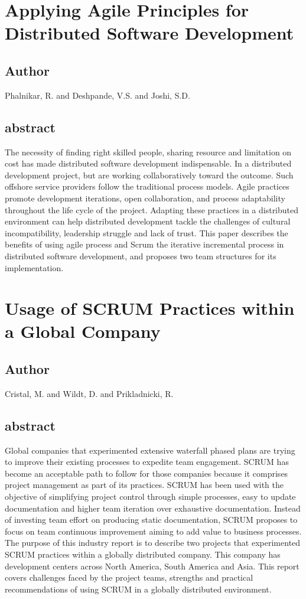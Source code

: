 \documentclass[lnbip,sechang,a4paper]{svmultln}
\begin{document}
\section{Applying Agile Principles for Distributed Software Development}
\subsection{Author}
Phalnikar, R. and Deshpande, V.S. and Joshi, S.D.
\subsection{abstract}
The necessity of finding right skilled people, sharing resource and limitation
on cost has made distributed software development indispensable. In a distributed development project, but are working collaboratively toward the outcome. Such offshore service providers follow the traditional process models. Agile practices promote development iterations, open collaboration, and process adaptability throughout the life cycle of the project. Adapting these practices in a distributed environment can help distributed development tackle the challenges of cultural incompatibility, leadership struggle and lack of trust. This paper describes the benefits of using agile process and Scrum the iterative incremental process in distributed software development, and proposes two team structures for its implementation.
\cite{4777400}
\section{Usage of SCRUM Practices within a Global Company}
\subsection{Author}
Cristal, M. and Wildt, D. and Prikladnicki, R.
\subsection{abstract}
Global companies that experimented extensive waterfall phased plans are trying
to improve their existing processes to expedite team engagement. SCRUM has
become an acceptable path to follow for those companies because it comprises project management as part of its practices. SCRUM has been used with the objective of simplifying project control through simple processes, easy to update documentation and higher team iteration over exhaustive documentation. Instead of investing team effort on producing static documentation, SCRUM proposes to focus on team continuous improvement aiming to add value to business processes. The purpose of this industry report is to describe two projects that experimented SCRUM practices within a globally distributed company. This company has development centers across North America, South America and Asia. This report covers challenges faced by the project teams, strengths and practical recommendations of using SCRUM in a globally distributed environment.
\cite{4638671}
\end{document}
